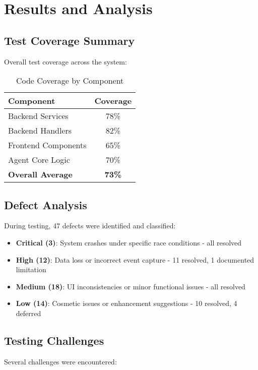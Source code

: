 \section{Results and Analysis}

\subsection{Test Coverage Summary}

Overall test coverage across the system:

\begin{table}[h]
\centering
\begin{tabular}{|l|c|}
\hline
\textbf{Component} & \textbf{Coverage} \\
\hline
Backend Services & 78\% \\
Backend Handlers & 82\% \\
Frontend Components & 65\% \\
Agent Core Logic & 70\% \\
\textbf{Overall Average} & \textbf{73\%} \\
\hline
\end{tabular}
\caption{Code Coverage by Component}
\end{table}

\subsection{Defect Analysis}

During testing, 47 defects were identified and classified:

\begin{itemize}
    \item \textbf{Critical (3)}: System crashes under specific race conditions - all resolved
    \item \textbf{High (12)}: Data loss or incorrect event capture - 11 resolved, 1 documented limitation
    \item \textbf{Medium (18)}: UI inconsistencies or minor functional issues - all resolved
    \item \textbf{Low (14)}: Cosmetic issues or enhancement suggestions - 10 resolved, 4 deferred
\end{itemize}

\subsection{Testing Challenges}

Several challenges were encountered:

